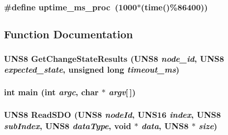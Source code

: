 \subsubsection{\setlength{\rightskip}{0pt plus 5cm}\#define uptime\_\-ms\_\-proc~(1000$\ast$(time()\%86400))}\label{main_8c_6faddd33869dd1ccf360315b1f11b554}




\subsection{Function Documentation}
\subsubsection{\setlength{\rightskip}{0pt plus 5cm}UNS8 Get\-Change\-State\-Results (UNS8 {\em node\_\-id}, UNS8 {\em expected\_\-state}, unsigned long {\em timeout\_\-ms})}\label{main_8c_b324a2fad227690e3da744b69f7a8119}


\subsubsection{\setlength{\rightskip}{0pt plus 5cm}int main (int {\em argc}, char $\ast$ {\em argv}[$\,$])}\label{main_8c_0ddf1224851353fc92bfbff6f499fa97}


\subsubsection{\setlength{\rightskip}{0pt plus 5cm}UNS8 Read\-SDO (UNS8 {\em node\-Id}, UNS16 {\em index}, UNS8 {\em sub\-Index}, UNS8 {\em data\-Type}, void $\ast$ {\em data}, UNS8 $\ast$ {\em size})}\label{main_8c_d4427585d0ce571277ff22b72adce526}


